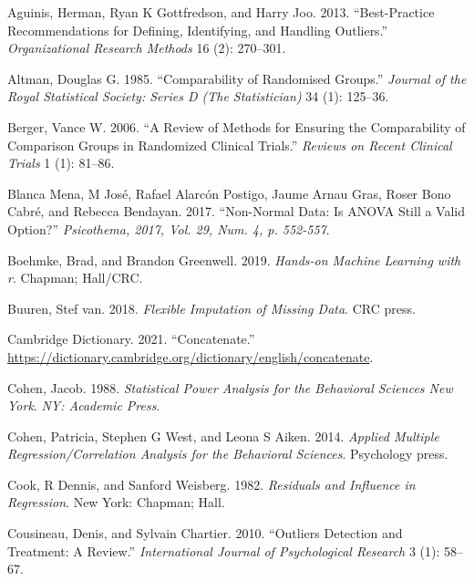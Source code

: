 \documentclass[
  letterpaper,
  DIV=11,
  numbers=noendperiod]{scrreprt}
\newlength{\cslhangindent}
\newenvironment{CSLReferences}[2] %
 {\begin{list}{}{%
  \setlength{\itemindent}{0pt}
  \setlength{\leftmargin}{0pt}
  \setlength{\parsep}{0pt}
  \ifodd #1
   \setlength{\leftmargin}{\cslhangindent}
   \setlength{\itemindent}{-1\cslhangindent}
  \fi
  \setlength{\itemsep}{#2\baselineskip}}}
 {\end{list}}
\begin{document}
\label{refs}
\begin{CSLReferences}{1}{0}
Aguinis, Herman, Ryan K Gottfredson, and Harry Joo. 2013.
{``Best-Practice Recommendations for Defining, Identifying, and Handling
Outliers.''} \emph{Organizational Research Methods} 16 (2): 270--301.

Altman, Douglas G. 1985. {``Comparability of Randomised Groups.''}
\emph{Journal of the Royal Statistical Society: Series D (The
Statistician)} 34 (1): 125--36.

Berger, Vance W. 2006. {``A Review of Methods for Ensuring the
Comparability of Comparison Groups in Randomized Clinical Trials.''}
\emph{Reviews on Recent Clinical Trials} 1 (1): 81--86.

Blanca Mena, M José, Rafael Alarcón Postigo, Jaume Arnau Gras, Roser
Bono Cabré, and Rebecca Bendayan. 2017. {``Non-Normal Data: Is ANOVA
Still a Valid Option?''} \emph{Psicothema, 2017, Vol. 29, Num. 4, p.
552-557}.

Boehmke, Brad, and Brandon Greenwell. 2019. \emph{Hands-on Machine
Learning with r}. Chapman; Hall/CRC.

Buuren, Stef van. 2018. \emph{Flexible Imputation of Missing Data}. CRC
press.

Cambridge Dictionary. 2021. {``Concatenate.''}
\url{https://dictionary.cambridge.org/dictionary/english/concatenate}.

Cohen, Jacob. 1988. \emph{Statistical Power Analysis for the Behavioral
Sciences New York}. \emph{NY: Academic Press}.

Cohen, Patricia, Stephen G West, and Leona S Aiken. 2014. \emph{Applied
Multiple Regression/Correlation Analysis for the Behavioral Sciences}.
Psychology press.

Cook, R Dennis, and Sanford Weisberg. 1982. \emph{Residuals and
Influence in Regression}. New York: Chapman; Hall.

Cousineau, Denis, and Sylvain Chartier. 2010. {``Outliers Detection and
Treatment: A Review.''} \emph{International Journal of Psychological
Research} 3 (1): 58--67.


\end{CSLReferences}
\end{document}
